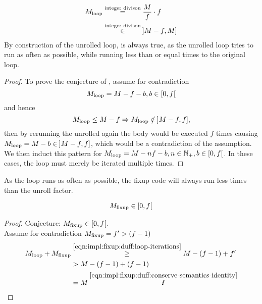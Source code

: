 \begin{equation}\label{eqn:impl:fixup:duff:loop-iterations}
\begin{aligned}
    M_{\text{loop}} &\overset{\text{integer divison}}{=} \frac{M}{f} \cdot f\\
    &\overset{\text{integer divison}}{\in} \medspace \rbrack M-f,M \rbrack
\end{aligned}
\end{equation}
By construction of the unrolled loop,  is always true, as the unrolled loop tries to run as often as possible, while running less than or equal times to the original loop.
\begin{proof}\label{proof:impl:fixup:duff:loop-iterations}
To prove the conjecture of , assume for contradiction
\[M_{\text{loop}} = M - f - b,  b \in \left \lbrack 0, f \right\lbrack \]
and hence
\[M_{\text{loop}} \leq M - f \Rightarrow M_{\text{loop}} \notin \medspace \rbrack M-f,f \rbrack,\]
then by rerunning the unrolled again the body would be executed $f$ times causing $M_{\text{loop}} = M - b \in \medspace \rbrack M-f,f \rbrack$, which would be a contradiction of the assumption.
We then induct this pattern for $M_{\text{loop}} = M - nf - b, n \in \mathbb{N}_{+}, b \in \lbrack 0, f \lbrack $.
In these cases, the loop must merely be iterated multiple times.
\end{proof}

As the loop runs as often as possible, the fixup code will always run less times than the unroll factor.

\begin{equation}\label{eqn:impl:fixup:duff:fixup-interval}
\begin{aligned}
    M_{\text{fixup}} \in \lbrack0, f\lbrack
\end{aligned}
\end{equation}

\begin{proof}\label{proof:impl:fixup:duff:fixup-interval}
Conjecture: $M_{\text{fixup}} \in \lbrack0, f\lbrack$.\\

Assume for contradiction $M_{\text{fixup}} = f' > (f - 1)$
\begin{align*}
    \Mloop + \Mfixup &\overset{\ref{eqn:impl:fixup:duff:loop-iterations}}{\geq} M - (f - 1) + f' \\
    &> M - (f - 1) + (f - 1) \\
    &= M \medspace \overset{\ref{eqn:impl:fixup:duff:conserve-semantics-identity}}{\mLightning}
\end{align*}
\end{proof}

